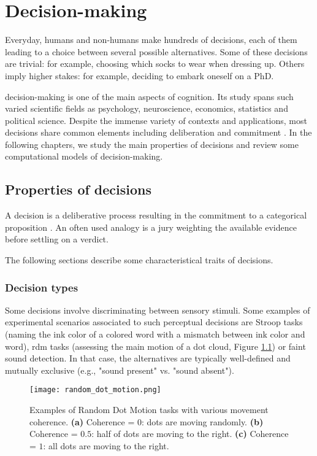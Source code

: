 \chapter{Decision-making}

Everyday, humans and non-humans make hundreds of \glspl{decision}, each of them leading to a \gls{choice} between several possible alternatives. Some of these decisions are trivial: for example, choosing which socks to wear when dressing up. Others imply higher stakes: for example, deciding to embark oneself on a PhD.

\Gls{decision-making} is one of the main aspects of cognition. Its study spans such varied scientific fields as psychology, neuroscience, economics, statistics and political science. Despite the immense variety of contexts and applications, most decisions share common elements including deliberation and commitment \cite{goldNeuralBasisDecision2007}. In the following chapters, we study the main properties of decisions and review some computational models of decision-making.

\section{Properties of decisions}

A decision is a deliberative process resulting in the commitment to a categorical proposition \cite{goldNeuralBasisDecision2007}. An often used analogy is a jury weighting the available evidence before settling on a verdict.

The following sections describe some characteristical traits of decisions.

\subsection{Decision types}

Some decisions involve discriminating between sensory stimuli. Some examples of experimental scenarios associated to such perceptual decisions are Stroop tasks (naming the ink color of a colored word with a mismatch between ink color and word), \acrlong{rdm} tasks (assessing the main motion of a dot cloud, Figure \ref{figure:rdm}) or faint sound detection. In that case, the alternatives are typically well-defined and mutually exclusive (e.g., "sound present" vs. "sound absent").

\begin{figure}[ht]
    \centering
    \texttt{[image: random\_dot\_motion.png]}
    \caption[Examples of Random Dot Motion tasks]{Examples of Random Dot Motion tasks with various movement coherence. \textbf{(a)} Coherence = $0$: dots are moving randomly. \textbf{(b)} Coherence = $0.5$: half of dots are moving to the right. \textbf{(c)} Coherence = $1$: all dots are moving to the right.}
    \label{figure:rdm}
\end{figure}

